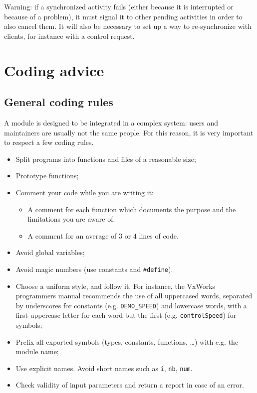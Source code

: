Warning: if   a   synchronized activity   fails (either  because   it  is
interrupted or because of a problem), it must signal  it to other pending
activities in order to also cancel them. It will also be necessary to set
up  a way to  re-synchronize  with clients,  for  instance with a control
request.


\section{Coding advice}

\subsection{General coding rules}

A  module is designed  to be  integrated in a  complex system:  users and
maintainers are usually not the same people.  For this reason, it is very
important to respect a few coding rules.

\begin{itemize}
\item Split programs into functions and files of a reasonable size;

\item Prototype functions;

\item Comment your code while you are writing it: 
   \begin{itemize}
   \item A comment for each function which documents the purpose and the
	 limitations you are aware of.
   \item A comment for an average of 3 or 4 lines of code.
   \end{itemize}

\item Avoid global variables;

\item Avoid magic numbers (use constants and \texttt{\#define}).

\item Choose a uniform style, and follow it. For instance, the VxWorks
      programmers manual recommends the use of 
all uppercased  words, separated by underscores  for constants (e.g. 
\texttt{DEMO\_SPEED}) and lowercase words, with a first uppercase letter for each
word but the first (e.g. \texttt{controlSpeed}) for symbols;

\item Prefix all exported symbols (types, constants, functions, \ldots)
with e.g. the module name;

\item Use explicit names. Avoid short names such as \texttt{i}, \texttt{nb},
\texttt{num}.

\item Check validity of input parameters and return a report in case of
an error.
\end{itemize}


